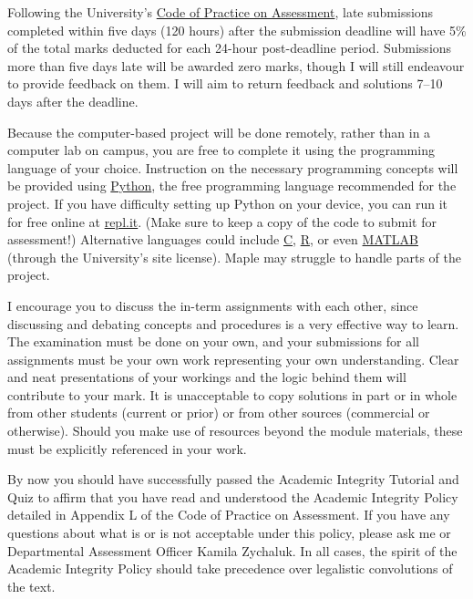 Following the University's \href{https://www.liverpool.ac.uk/media/livacuk/tqsd/aqsd/code_of_practice_on_assessment.pdf}{Code of Practice on Assessment}, late submissions completed within five days (120 hours) after the submission deadline will have 5\% of the total marks deducted for each 24-hour post-deadline period.
Submissions more than five days late will be awarded zero marks, though I will still endeavour to provide feedback on them.
I will aim to return feedback and solutions 7--10 days after the deadline.

Because the computer-based project will be done remotely, rather than in a computer lab on campus, you are free to complete it using the programming language of your choice.
Instruction on the necessary programming concepts will be provided using \href{https://www.python.org}{Python}, the free programming language recommended for the project.
If you have difficulty setting up Python on your device, you can run it for free online at \href{https://repl.it/languages/python3}{repl.it}.
(Make sure to keep a copy of the code to submit for assessment!)
Alternative languages could include \href{https://en.wikipedia.org/wiki/C_(programming_language)}{C}, \href{https://www.r-project.org}{R}, or even \href{https://matlab.mathworks.com}{MATLAB} (through the University's site license).
Maple may struggle to handle parts of the project.

I encourage you to discuss the in-term assignments with each other, since discussing and debating concepts and procedures is a very effective way to learn.
The examination must be done on your own, and your submissions for all assignments must be your own work representing your own understanding.
Clear and neat presentations of your workings and the logic behind them will contribute to your mark.
It is unacceptable to copy solutions in part or in whole from other students (current or prior) or from other sources (commercial or otherwise).
Should you make use of resources beyond the module materials, these must be explicitly referenced in your work.

By now you should have successfully passed the Academic Integrity Tutorial and Quiz to affirm that you have read and understood the Academic Integrity Policy detailed in Appendix L of the Code of Practice on Assessment.
If you have any questions about what is or is not acceptable under this policy, please ask me or Departmental Assessment Officer Kamila Zychaluk.
In all cases, the spirit of the Academic Integrity Policy should take precedence over legalistic convolutions of the text.



